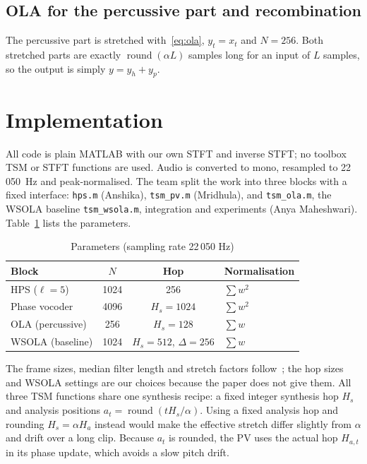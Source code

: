 \documentclass[conference]{IEEEtran}
\begin{document}
\subsection{OLA for the percussive part and recombination}
The percussive part is stretched with~\eqref{eq:ola}, $y_t=x_t$ and $N=256$. Both stretched parts are exactly $\operatorname{round}(\alpha L)$ samples long for an input of $L$ samples, so the output is simply $y=y_h+y_p$.

\section{Implementation}
\label{sec:impl}

All code is plain MATLAB with our own STFT and inverse STFT; no toolbox TSM or STFT functions are used. Audio is converted to mono, resampled to 22\,050~Hz and peak-normalised. The team split the work into three blocks with a fixed interface: \texttt{hps.m} (Anshika), \texttt{tsm\_pv.m} (Mridhula), and \texttt{tsm\_ola.m}, the WSOLA baseline \texttt{tsm\_wsola.m}, integration and experiments (Anya Maheshwari). Table~\ref{tab:params} lists the parameters.

\begin{table}[t]
\centering
\caption{Parameters (sampling rate 22\,050 Hz)}
\label{tab:params}
\begin{tabular}{@{}lccl@{}}
\toprule
Block & $N$ & Hop & Normalisation \\
\midrule
HPS ($\ell=5$) & 1024 & 256 & $\sum w^2$ \\
Phase vocoder & 4096 & $H_s=1024$ & $\sum w^2$ \\
OLA (percussive) & 256 & $H_s=128$ & $\sum w$ \\
WSOLA (baseline) & 1024 & $H_s=512$, $\Delta=256$ & $\sum w$ \\
\bottomrule
\end{tabular}
\end{table}

The frame sizes, median filter length and stretch factors follow~\cite{driedger14}; the hop sizes and WSOLA settings are our choices because the paper does not give them. All three TSM functions share one synthesis recipe: a fixed integer synthesis hop $H_s$ and analysis positions $a_t=\operatorname{round}(tH_s/\alpha)$. Using a fixed analysis hop and rounding $H_s=\alpha H_a$ instead would make the effective stretch differ slightly from $\alpha$ and drift over a long clip. Because $a_t$ is rounded, the PV uses the actual hop $H_{a,t}$ in its phase update, which avoids a slow pitch drift.
\end{document}
